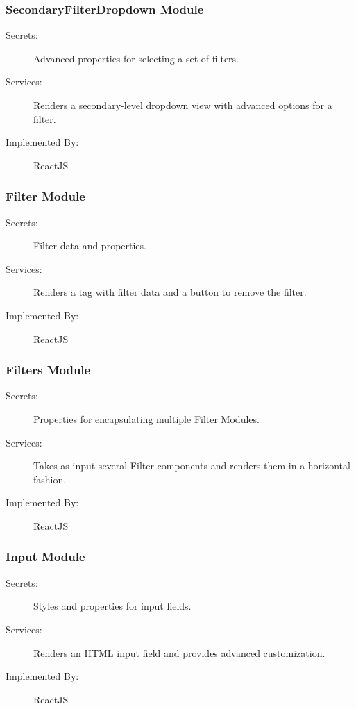 \documentclass[12pt, titlepage]{article}
\begin{document}
\subsubsection{SecondaryFilterDropdown Module \label{mSecondaryFilterDropdownModule}}
\begin{description}
\item[Secrets:]Advanced properties for selecting a set of filters.
\item[Services:]Renders a secondary-level dropdown view with advanced options for a filter.
\item[Implemented By:] ReactJS
\end{description}

\subsubsection{Filter Module \label{mFilterModule}}
\begin{description}
\item[Secrets:]Filter data and properties.
\item[Services:]Renders a tag with filter data and a button to remove the filter.
\item[Implemented By:] ReactJS
\end{description}

\subsubsection{Filters Module \label{mFiltersModule}}
\begin{description}
\item[Secrets:]Properties for encapsulating multiple Filter Modules.
\item[Services:]Takes as input several Filter components and renders them in a horizontal fashion.
\item[Implemented By:] ReactJS
\end{description}

\subsubsection{Input Module \label{mInputModule}}
\begin{description}
\item[Secrets:]Styles and properties for input fields.
\item[Services:]Renders an HTML input field and provides advanced customization.
\item[Implemented By:] ReactJS
\end{description}
\end{document}

